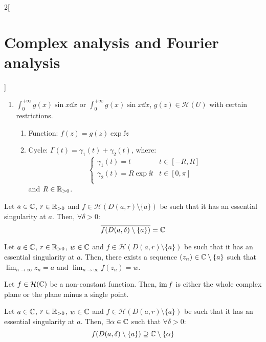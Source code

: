 \documentclass[../../../main.tex]{subfiles}
\begin{document}
\begin{multicols}{2}[\section{Complex analysis and Fourier analysis}]
\begin{method}
\begin{enumerate}
\begin{enumerate}
$$                    $$
                    and $\varepsilon,\delta,R\in\RR_{>0}$.
            \end{enumerate}
      \item $\displaystyle\int_0^{+\infty} g(x)\sin{x}\dd{x}$ or $\displaystyle\int_0^{+\infty} g(x)\sin{x}\dd{x}$, $g(z)\in\mathcal{H}(U)$ with certain restrictions.
            \begin{enumerate}
              \item Function: $f(z)=g(z)\exp{\ii z}$
              \item Cycle:  $\Gamma(t)=\gamma_1(t)+\gamma_2(t)$, where:
                    $$
                      \begin{cases}
                        \gamma_1(t)=t            & t\in[-R,R]  \\
                        \gamma_2(t)=R\exp{\ii t} & t\in[0,\pi] \\
                      \end{cases}
                    $$
                    and $R\in\mathbb{R}_{>0}$.
            \end{enumerate}
    \end{enumerate}
  \end{method}
  \begin{theorem}
    Let $a\in\mathbb{C}$, $r\in\mathbb{R}_{>0}$ and $f\in\mathcal{H}(D(a,r)\setminus\{a\})$ be such that it has an essential singularity at $a$. Then, $\forall \delta>0$: $$\overline{f(D(a,\delta)\setminus\{a\})}=\mathbb{C}$$
  \end{theorem}
  \begin{corollary}
    Let $a\in\mathbb{C}$, $r\in\mathbb{R}_{>0}$, $w\in\mathbb{C}$ and $f\in\mathcal{H}(D(a,r)\setminus\{a\})$ be such that it has an essential singularity at $a$. Then, there exists a sequence $(z_n)\in\mathbb{C}\setminus\{a\}$ such that $\displaystyle\lim_{n\to\infty}z_n=a$ and $\displaystyle\lim_{n\to\infty}f(z_n)=w$.
  \end{corollary}
  \begin{theorem}
    Let $f\in\mathcal{H}(\mathbb{C})$ be a non-constant function. Then, $\operatorname{im} f$ is either the whole complex plane or the plane minus a single point.
  \end{theorem}
  \begin{theorem}
    Let $a\in\mathbb{C}$, $r\in\mathbb{R}_{>0}$, $w\in\mathbb{C}$ and $f\in\mathcal{H}(D(a,r)\setminus\{a\})$ be such that it has an essential singularity at $a$. Then, $\exists\alpha\in\mathbb{C}$ such that $\forall \delta>0$: $$f(D(a,\delta)\setminus\{a\})\supseteq\mathbb{C}\setminus\{\alpha\}$$

\end{theorem}
\end{multicols}
\end{document}
